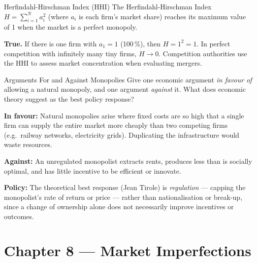 \documentclass[paper=a5]{scrartcl}
\begin{document}
\begin{question}[type=tf]{Herfindahl-Hirschman Index (HHI)}
The Herfindahl-Hirschman Index $H = \sum_{i=1}^{N} a_i^2$ (where $a_i$ is
each firm's market share) reaches its maximum value of 1 when the market
is a perfect monopoly.
\truefalse[true]
\begin{solution}
  \textbf{True.} If there is one firm with $a_1 = 1$ (100\,\%), then
  $H = 1^2 = 1$. In perfect competition with infinitely many tiny firms, $H
  \to 0$. Competition authorities use the HHI to assess market concentration
  when evaluating mergers.
\end{solution}
\end{question}

\begin{question}[type=open]{Arguments For and Against Monopolies}
Give one economic argument \emph{in favour of} allowing a natural monopoly, and
one argument \emph{against} it. What does economic theory suggest as the best
policy response?

\answerlines[7]

\begin{solution}
  \textbf{In favour:} Natural monopolies arise where fixed costs are so high
  that a single firm can supply the entire market more cheaply than two
  competing firms (e.g.\ railway networks, electricity grids). Duplicating
  the infrastructure would waste resources.

  \textbf{Against:} An unregulated monopolist extracts rents, produces less
  than is socially optimal, and has little incentive to be efficient or
  innovate.

  \textbf{Policy:} The theoretical best response (Jean Tirole) is
  \emph{regulation} — capping the monopolist's rate of return or price —
  rather than nationalisation or break-up, since a change of ownership alone
  does not necessarily improve incentives or outcomes.
\end{solution}
\end{question}


\section{Chapter 8 — Market Imperfections}
\end{document}
